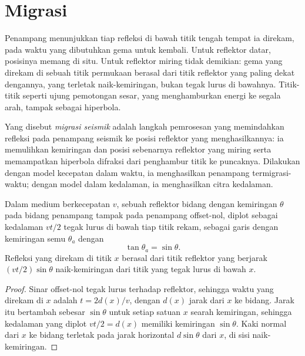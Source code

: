 \section{Migrasi}

Penampang  menunjukkan tiap refleksi di bawah titik tengah tempat ia
direkam, pada waktu yang dibutuhkan gema untuk kembali. Untuk reflektor datar,
posisinya memang di situ. Untuk reflektor miring tidak demikian: gema yang direkam di sebuah titik permukaan berasal
dari titik reflektor yang paling dekat dengannya, yang terletak naik-kemiringan,
bukan tegak lurus di bawahnya. Titik-titik seperti ujung pemotongan sesar, yang
menghamburkan energi ke segala arah, tampak sebagai hiperbola.

\begin{definition}\label{def:b3:exploration-seismology:migration}
Yang disebut \emph{migrasi seismik} adalah langkah pemrosesan yang
memindahkan refleksi pada penampang seismik ke posisi reflektor
yang menghasilkannya: ia memulihkan kemiringan dan posisi sebenarnya reflektor yang miring
serta memampatkan hiperbola difraksi dari penghambur titik ke
puncaknya. Dilakukan dengan model kecepatan dalam waktu, ia menghasilkan penampang
termigrasi-waktu; dengan model dalam kedalaman, ia menghasilkan citra kedalaman.
\end{definition}

\begin{theorem}\label{thm:b3:exploration-seismology:dip}
Dalam medium berkecepatan $v$, sebuah reflektor bidang dengan kemiringan $\theta$ pada bidang
penampang tampak pada penampang offset-nol, diplot sebagai kedalaman $vt/2$
tegak lurus di bawah tiap titik rekam, sebagai garis dengan kemiringan semu $\theta_a$
dengan
\[
  \tan\theta_a = \sin\theta .
\]
Refleksi yang direkam di titik $x$ berasal dari titik reflektor yang berjarak
$(vt/2)\sin\theta$ naik-kemiringan dari titik yang tegak lurus di bawah $x$.
\end{theorem}

\begin{proof}
Sinar offset-nol tegak lurus terhadap reflektor, sehingga waktu yang direkam di $x$ adalah
$t = 2d(x)/v$, dengan $d(x)$ jarak dari $x$ ke bidang. Jarak itu
bertambah sebesar $\sin\theta$ untuk setiap satuan $x$ searah kemiringan, sehingga kedalaman yang diplot
$vt/2 = d(x)$ memiliki kemiringan $\sin\theta$. Kaki normal dari $x$
ke bidang terletak pada jarak horizontal $d\sin\theta$ dari $x$, di sisi
naik-kemiringan.
\end{proof}

